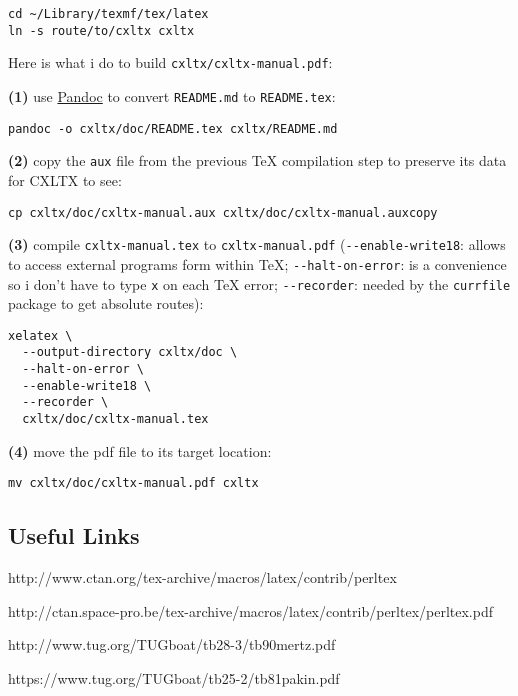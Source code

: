 \begin{verbatim}
cd ~/Library/texmf/tex/latex
ln -s route/to/cxltx cxltx
\end{verbatim}

Here is what i do to build \texttt{cxltx/cxltx-manual.pdf}:

\textbf{(1)} use \href{http://http://johnmacfarlane.net/pandoc}{Pandoc}
to convert \texttt{README.md} to \texttt{README.tex}:

\begin{verbatim}
pandoc -o cxltx/doc/README.tex cxltx/README.md
\end{verbatim}

\textbf{(2)} copy the \texttt{aux} file from the previous TeX
compilation step to preserve its data for CXLTX to see:

\begin{verbatim}
cp cxltx/doc/cxltx-manual.aux cxltx/doc/cxltx-manual.auxcopy
\end{verbatim}

\textbf{(3)} compile \texttt{cxltx-manual.tex} to
\texttt{cxltx-manual.pdf} (\texttt{-{}-enable-write18}: allows to access
external programs form within TeX; \texttt{-{}-halt-on-error}: is a
convenience so i don't have to type \texttt{x} on each TeX error;
\texttt{-{}-recorder}: needed by the \texttt{currfile} package to get
absolute routes):

\begin{verbatim}
xelatex \
  --output-directory cxltx/doc \
  --halt-on-error \
  --enable-write18 \
  --recorder \
  cxltx/doc/cxltx-manual.tex
\end{verbatim}

\textbf{(4)} move the pdf file to its target location:

\begin{verbatim}
mv cxltx/doc/cxltx-manual.pdf cxltx
\end{verbatim}

\subsection{Useful Links}\label{useful-links}

http://www.ctan.org/tex-archive/macros/latex/contrib/perltex

http://ctan.space-pro.be/tex-archive/macros/latex/contrib/perltex/perltex.pdf

http://www.tug.org/TUGboat/tb28-3/tb90mertz.pdf

https://www.tug.org/TUGboat/tb25-2/tb81pakin.pdf

